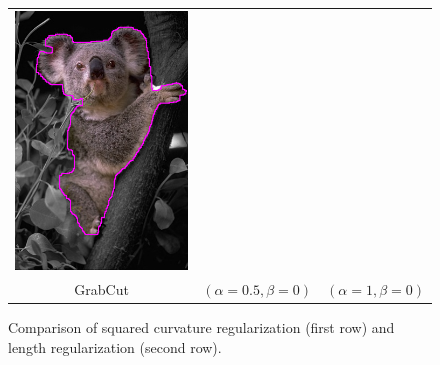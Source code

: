 \documentclass[runningheads]{llncs}
\begin{document}
\begin{figure}
\begin{tabular}{ccc}
	\includegraphics[scale=0.25]{images/segmentation/coala/r3/lg2_sq0_dt1_it50.png} \\

	GrabCut & $(\alpha=0.5, \beta=0)$ & $(\alpha=1, \beta=0)$
\end{tabular}	
\caption{Comparison of squared curvature regularization (first row) and length regularization (second row). }
\label{fig:parameters-influence}
\end{figure}
\end{document}
